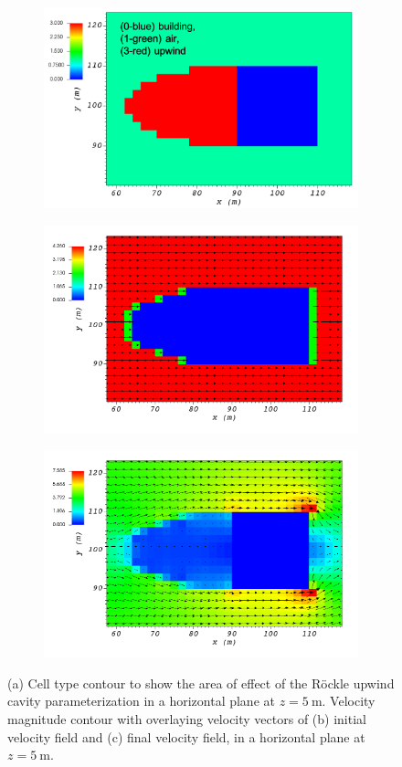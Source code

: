 \begin{figure}[H]
    \centering
    \begin{subfigure}{\textwidth}
    \centering
    \includegraphics[width=10.3cm,keepaspectratio]{Images/upwind_z_5_1_init_icell.png}
    \caption{}
    \end{subfigure}
    \begin{subfigure}{\textwidth}
    \centering
    \includegraphics[width=11.0cm,keepaspectratio]{Images/upwind_z_5_1_init_vel.png}
    \caption{}
    \end{subfigure}
    \begin{subfigure}{\textwidth}
    \centering
    \includegraphics[width=11.0cm,keepaspectratio]{Images/upwind_z_5_1_final.png}
    \caption{}
    \end{subfigure}
    \caption{(a) Cell type contour to show the area of effect of the R\"{o}ckle upwind cavity parameterization in a horizontal plane at $z=5\ \si{\meter}$. Velocity magnitude contour with overlaying velocity vectors of (b) initial velocity field and (c) final velocity field, in a horizontal plane at $z=5\ \si{\meter}$.}
\end{figure}

